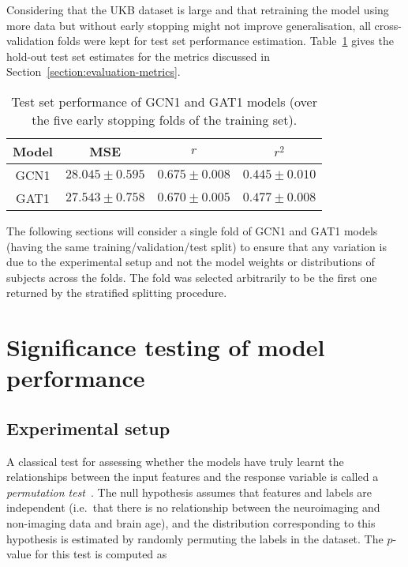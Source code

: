 Considering that the UKB dataset is large and that retraining the model using more data but without early stopping might not improve generalisation, all cross-validation folds were kept for test set performance estimation. Table~\ref{table:test-performance} gives the hold-out test set estimates for the metrics discussed in Section~\ref{section:evaluation-metrics}.

\begin{table}[h]
    \caption{Test set performance of GCN1 and GAT1 models (over the five early stopping folds of the training set).}\label{table:test-performance}
    \centering
    \small
    \begin{tabular}{cccc}
        \hline
    \textbf{Model} & MSE & $r$ & $r^2$ \\  \hline
        GCN1 & $28.045 \pm 0.595$ & $0.675 \pm 0.008$ & $0.445 \pm 0.010$ \\
        GAT1 & $27.543 \pm 0.758$ & $0.670 \pm 0.005$ & $0.477 \pm 0.008$ \\ \hline
\end{tabular}
\end{table}

The following sections will consider a single fold of GCN1 and GAT1 models (having the same training/validation/test split) to ensure that any variation is due to the experimental setup and not the model weights or distributions of subjects across the folds. The fold was selected arbitrarily to be the first one returned by the stratified splitting procedure.

\section{Significance testing of model performance}
\label{section:significance-testing}
\subsection{Experimental setup}
A classical test for assessing whether the models have truly learnt the relationships between the input features and the response variable is called a \textit{permutation test}~\cite{ojala2010permutation}. The null hypothesis assumes that features and labels are independent (i.e.\ that there is no relationship between the neuroimaging and non-imaging data and brain age), and the distribution corresponding to this hypothesis is estimated by randomly permuting the labels in the dataset. The $p$-value for this test is computed as

